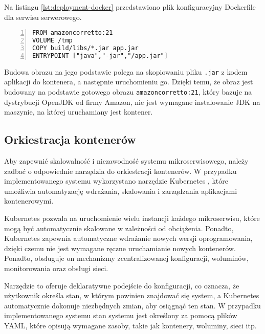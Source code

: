 Na listingu \ref{lst:deployment-docker} przedstawiono plik konfiguracyjny Dockerfile dla serwisu serwerowego.

\begin{lstlisting}[caption={Instrukcja budowania obrazu Docker serwisu serwerowego},label={lst:deployment-docker},captionpos=b,numbers=left]
FROM amazoncorretto:21
VOLUME /tmp
COPY build/libs/*.jar app.jar
ENTRYPOINT ["java","-jar","/app.jar"]
\end{lstlisting}

Budowa obrazu na jego podstawie polega na skopiowaniu pliku \texttt{.jar} z kodem aplikacji do kontenera, a następnie uruchomieniu go. Dzięki temu, że obraz jest budowany na podstawie gotowego obrazu \texttt{amazoncorretto:21}, który bazuje na dystrybucji OpenJDK od firmy Amazon, nie jest wymagane instalowanie JDK na maszynie, na której uruchamiany jest kontener.
    
\subsection{Orkiestracja kontenerów}

Aby zapewnić skalowalność i niezawodność systemu mikroserwisowego, należy zadbać o odpowiednie narzędzia do orkiestracji kontenerów. W przypadku implementowanego systemu wykorzystano narzędzie Kubernetes \cite{k8s}, które umożliwia automatyzację wdrażania, skalowania i zarządzania aplikacjami kontenerowymi.

Kubernetes pozwala na uruchomienie wielu instancji każdego mikroserwisu, które mogą być automatycznie skalowane w zależności od obciążenia. Ponadto, Kubernetes zapewnia automatyczne wdrażanie nowych wersji oprogramowania, dzięki czemu nie jest wymagane ręczne uruchamianie nowych kontenerów. Ponadto, obsługuje on mechanizmy zcentralizowanej konfiguracji, woluminów, monitorowania oraz obsługi sieci.

Narzędzie to oferuje deklaratywne podejście do konfiguracji, co oznacza, że użytkownik określa stan, w którym powinien znajdować się system, a Kubernetes automatycznie dokonuje niezbędnych zmian, aby osiągnąć ten stan. W przypadku implementowanego systemu stan systemu jest określony za pomocą plików YAML, które opisują wymagane zasoby, takie jak kontenery, woluminy, sieci itp.

